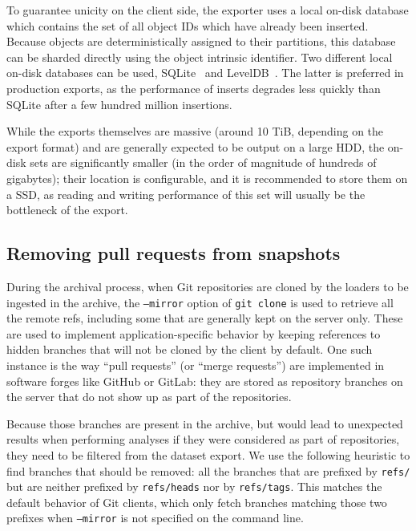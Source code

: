To guarantee unicity on the client side, the exporter uses a local on-disk
database which contains the set of all object IDs which have already been
inserted. Because objects are deterministically assigned to their partitions,
this database can be sharded directly using the object intrinsic identifier.
Two different local on-disk databases can be used,
SQLite~\cite{owens2006sqlitebook} and LevelDB~\cite{ghemawat2011leveldb}. The
latter is preferred in production exports, as the performance of inserts
degrades less quickly than SQLite after a few hundred million insertions.

While the exports themselves are massive (around 10 TiB, depending on the
export format) and are generally expected to be output on a large \gls{HDD},
the on-disk sets are significantly smaller (in the order of magnitude of
hundreds of gigabytes); their location is configurable, and it is recommended
to store them on a \gls{SSD}, as reading and writing performance of this set
will usually be the bottleneck of the export.

\subsection{Removing pull requests from snapshots}

During the archival process, when Git repositories are cloned by the loaders to
be ingested in the archive, the \texttt{--mirror} option of \texttt{git clone}
is used to retrieve all the remote refs, including some that are generally kept
on the server only. These are used to implement application-specific behavior
by keeping references to hidden branches that will not be cloned by the client
by default. One such instance is the way ``pull requests'' (or ``merge
requests'') are implemented in software forges like GitHub or GitLab: they are
stored as repository branches on the server that do not show up as part of the
repositories.

Because those branches are present in the archive, but would lead to unexpected
results when performing analyses if they were considered as part of
repositories, they need to be filtered from the dataset export. We use the
following heuristic to find branches that should be removed: all the branches
that are prefixed by \texttt{refs/} but are neither prefixed by
\texttt{refs/heads} nor by \texttt{refs/tags}. This matches the default
behavior of Git clients, which only fetch branches matching those two prefixes
when \texttt{--mirror} is not specified on the command line.

